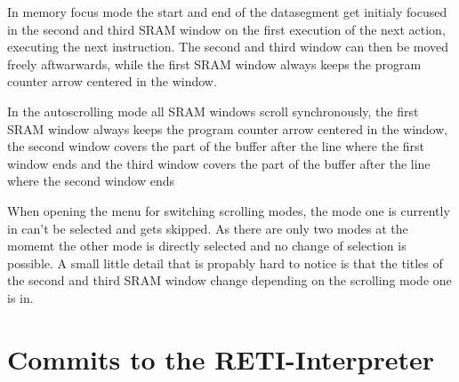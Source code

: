 \documentclass{report}
\begin{document}
In \alert{memory focus} mode the start and end of the datasegment get initialy  focused in the second and third SRAM window on the first execution of the next action, executing the next instruction. The second and third window can then be moved freely aftwarwards, while the first SRAM window always keeps the program counter arrow centered in the window.

In the \alert{autoscrolling} mode all SRAM windows scroll synchronously, the first SRAM window always keeps the program counter arrow centered in the window, the second window covers the part of the buffer after the line where the first window ends and the third window covers the part of the buffer after the line where the second window ends

When opening the menu for switching scrolling modes, the mode one is currently in can't be selected and gets skipped. As there are only two modes at the momemt the other mode is directly selected and no change of selection is possible. A small little detail that is propably hard to notice is that the titles of the second and third SRAM window change depending on the scrolling mode one is in.


\section{Commits to the RETI-Interpreter}
\label{sec:commits to the reti-interpreter}
\end{document}
